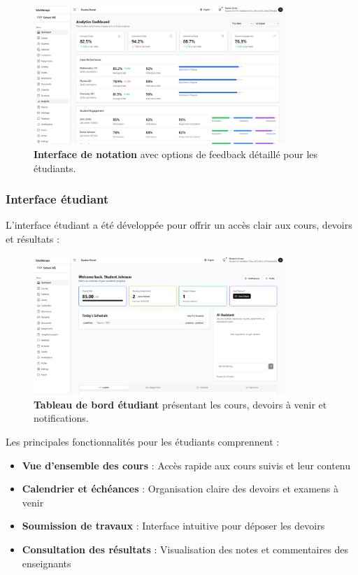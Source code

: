 \begin{figure}[H]
  \centering
  \includegraphics[width=0.85\textwidth,keepaspectratio]{pfe-pics/teacher/Screenshot 2025-06-09 at 22-55-38 Vite React TS.png}
  \caption{\textbf{Interface de notation} avec options de feedback détaillé pour les étudiants.}
  \label{fig:grading_interface}
\end{figure}

\subsubsection{Interface étudiant}

L'interface étudiant a été développée pour offrir un accès clair aux cours, devoirs et résultats :

\begin{figure}[H]
  \centering
  \includegraphics[width=0.85\textwidth,keepaspectratio]{pfe-pics/student/Screenshot 2025-06-09 at 22-43-56 Vite React TS.png}
  \caption{\textbf{Tableau de bord étudiant} présentant les cours, devoirs à venir et notifications.}
  \label{fig:student_dashboard}
\end{figure}

Les principales fonctionnalités pour les étudiants comprennent :

\begin{itemize}
  \item \textbf{Vue d'ensemble des cours} : Accès rapide aux cours suivis et leur contenu
  
  \item \textbf{Calendrier et échéances} : Organisation claire des devoirs et examens à venir
  
  \item \textbf{Soumission de travaux} : Interface intuitive pour déposer les devoirs
  
  \item \textbf{Consultation des résultats} : Visualisation des notes et commentaires des enseignants
\end{itemize}

